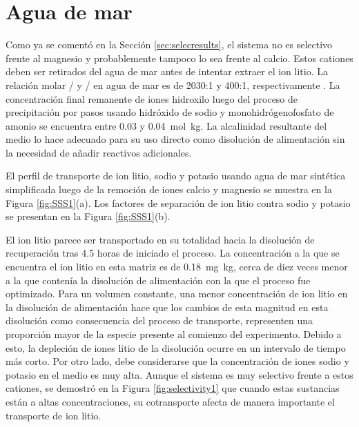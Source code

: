 \section{Agua de mar}\label{sec:resultsSSS}
Como ya se comentó en la Sección \ref{sec:selecresults}, el sistema no es selectivo frente al magnesio y probablemente tampoco lo sea frente al calcio. Estos cationes deben ser retirados del agua de mar antes de intentar extraer el ion litio. La relación molar / y / en agua de mar es de 2030:1 y 400:1, respectivamente \citep{Dickson1994}. La concentración final remanente de iones hidroxilo luego del proceso de precipitación por pasos usando hidróxido de sodio y monohidrógenofosfato de amonio se encuentra entre 0.03 y 0.04~mol~kg\mnn. La alcalinidad resultante del medio lo hace adecuado para su uso directo como disolución de alimentación sin la necesidad de añadir reactivos adicionales. 

El perfil de transporte de ion litio, sodio y potasio usando agua de mar sintética simplificada luego de la remoción de iones calcio y magnesio se muestra en la Figura \ref{fig:SSS1}(a). Los factores de separación de ion litio contra sodio y potasio se presentan en la  Figura \ref{fig:SSS1}(b).

El ion litio parece ser transportado en su totalidad hacia la disolución de recuperación tras 4.5 horas de iniciado el proceso. La concentración a la que se encuentra el ion litio en esta matriz es de 0.18~mg~kg\mnn, cerca de diez veces menor a la que contenía la disolución de alimentación con la que el proceso fue optimizado. Para un volumen constante, una menor concentración de ion litio en la disolución de alimentación hace que los cambios de esta magnitud en esta disolución como consecuencia del proceso de transporte, representen una proporción mayor de la especie presente al comienzo del experimento. Debido a esto, la depleción de iones litio de la disolución ocurre en un intervalo de tiempo más corto.  Por otro lado, debe considerarse que la concentración de iones sodio y potasio en el medio es muy alta. Aunque el sistema es muy selectivo frente a estos cationes, se demostró en la Figura \ref{fig:selectivity1} que cuando estas sustancias están a altas concentraciones, su cotransporte afecta de manera importante el transporte de ion litio.

